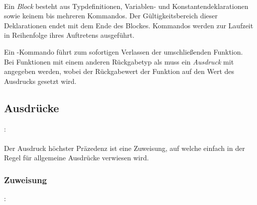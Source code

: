 \hspace*{1cm}\glq{}\grq {}  \glq\Gt{;}\grq \\
\hspace*{1cm} \\
\hspace*{1cm} \\
\hspace*{1cm} \\
\hspace*{1cm}\glq\Gt{\{}\grq  \glq\Gt{\}}\grq \\
\hspace*{1cm}\glq\Gt{\{}\grq {}  \glq\Gt{\}}\grq \\

Ein \emph{Block} besteht aus Typdefinitionen, Variablen- und Konstantendeklarationen sowie keinem bis mehreren Kommandos.
Der Gültigkeitsbereich dieser Deklarationen endet mit dem Ende des Blockes. Kommandos werden zur Laufzeit in Reihenfolge ihres
Auftretens ausgeführt.

Ein -Kommando führt zum sofortigen Verlassen der umschließenden Funktion.
Bei Funktionen mit einem anderen Rückgabetyp als  muss ein \emph{Ausdruck} mit angegeben
werden, wobei der Rückgabewert der Funktion auf den Wert des Ausdrucks gesetzt wird.

\subsection{Ausdrücke}\label{Ausdruecke}
:\label{ausdruck}\\
\hspace*{1cm} \\

Der Ausdruck höchster Präzedenz ist eine Zuweisung, auf welche einfach in der Regel für
allgemeine Ausdrücke verwiesen wird.


\subsubsection{Zuweisung}\label{Zuweisung}
:\label{asdr_zuweisung}\\
\hspace*{1cm} \\
\hspace*{1cm} \glq\Gt{=}\grq  {} \\

